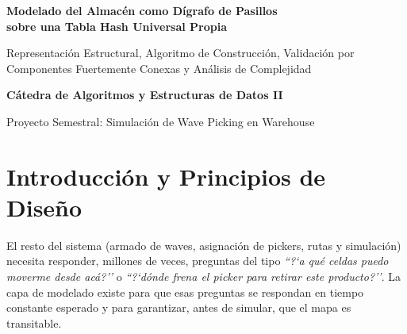 \documentclass[11pt,a4paper]{article}
\theoremstyle{definition}
\begin{document}
\begin{center}
{\LARGE\bfseries Modelado del Almacén como Dígrafo de Pasillos\\[2pt] sobre una Tabla Hash Universal Propia\par}
\vspace{6pt}
{\large Representación Estructural, Algoritmo de Construcción, Validación por Componentes Fuertemente Conexas y Análisis de Complejidad\par}
\vspace{14pt}
{\large\bfseries Cátedra de Algoritmos y Estructuras de Datos II\par}
{\large Proyecto Semestral: Simulación de Wave Picking en Warehouse\par}
\end{center}

\vspace{8pt}
\begin{abstract}
Este documento formaliza la capa de modelado del sistema: la traducción del escenario descripto en JSON a un \emph{dígrafo de pasillos} $G=(V,E)$ sobre el cual operan el armado de waves, el cálculo de rutas y la simulación. Se definen con precisión el conjunto de nodos (celdas transitables), la regla que genera las aristas dirigidas a partir del sentido de circulación, y el cálculo de las celdas de acceso a racks y zonas de despacho. Toda la topología se almacena en una \emph{tabla hash propia} con hashing universal de Carter y Wegman, resolución de colisiones por encadenamiento y redimensionamiento a tamaño primo. La transitabilidad del mapa se certifica con el algoritmo de Kosaraju en versión iterativa. Se demuestran la inyectividad de la codificación de coordenadas, la universalidad de la familia de funciones hash, el costo esperado constante de las operaciones de la tabla, la correctitud del dígrafo y de Kosaraju, y la linealidad del proceso completo en el área del almacén. Se incluye una taxonomía de casos de borde y mediciones sobre los escenarios del proyecto.
\end{abstract}

\tableofcontents

\section{Introducción y Principios de Diseño}

El resto del sistema (armado de waves, asignación de pickers, rutas y simulación) necesita responder, millones de veces, preguntas del tipo \emph{``?`a qué celdas puedo moverme desde acá?''} o \emph{``?`dónde frena el picker para retirar este producto?''}. La capa de modelado existe para que esas preguntas se respondan en tiempo constante esperado y para garantizar, antes de simular, que el mapa es transitable.
\end{document}
